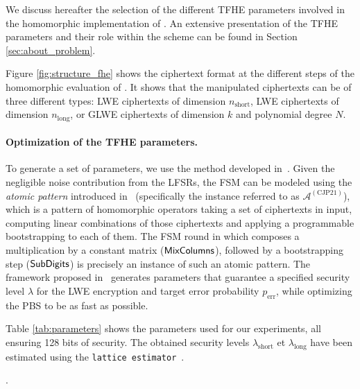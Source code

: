 We discuss hereafter the selection of the different TFHE parameters involved in the homomorphic implementation of \coolName. An extensive presentation of the TFHE parameters and their role within the scheme can be found in Section \ref{sec:about_problem}.

Figure \ref{fig:structure_fhe} shows the ciphertext format at the different steps of the homomorphic evaluation of \coolName. It shows that the manipulated ciphertexts can be of three different types: LWE ciphertexts of dimension $n_{\text{short}}$, LWE ciphertexts of dimension $n_{\text{long}}$, or GLWE ciphertexts of dimension $k$ and polynomial degree $N$.
	




\paragraph{Optimization of the TFHE parameters.}
To generate a set of parameters, we use the method developed in~\cite{JC:BBBCLO23}. Given the negligible noise contribution from the LFSRs, the FSM can be modeled using the \emph{atomic pattern} introduced in~\cite{JC:BBBCLO23} (specifically the instance referred to as $\mathcal{A}^{(\text{CJP21})}$), which is a pattern of homomorphic operators taking a set of ciphertexts in input, computing linear combinations of those ciphertexts and applying a programmable bootstrapping to each of them. The FSM round in \coolName which composes a multiplication by a constant matrix ($\text{\textsf{MixColumns}}$), followed by a bootstrapping step ($\text{\textsf{SubDigits}}$) is precisely an instance of such an atomic pattern. The framework proposed in~\cite{JC:BBBCLO23} generates parameters that guarantee a specified security level $\lambda$ for the LWE encryption and target error probability $p_{\text{err}}$, while optimizing the PBS to be as fast as possible. 

Table \ref{tab:parameters} shows the parameters used for our experiments, all ensuring 128 bits of security. The obtained security levels $\lambda_{\text{short}}$ et $\lambda_{\text{long}}$ have been estimated using the \texttt{lattice estimator}~\cite{lattice-estimator}.

\begin{table}[t!]
\centering
\caption{TFHE Parameters used in our experiments}.
\label{tab:parameters}
\renewcommand{\arraystretch}{1.3}  %
	\end{table}



